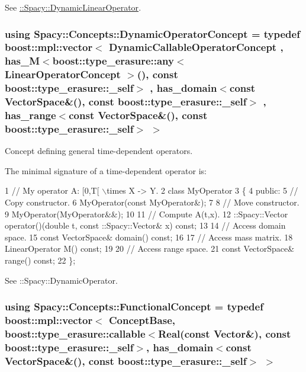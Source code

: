 See \hyperlink{group__SpacyGroup_gaad10aa7d5443703377b768fa41a3c7ea_DynamicLinearOperatorAnchor}{\+:\+:Spacy\+:\+:Dynamic\+Linear\+Operator}. \hypertarget{group__ConceptGroup_ga2c979d268f0ca7a436776a9631d10af7_ga2c979d268f0ca7a436776a9631d10af7}{}
\subsubsection[{Dynamic\+Operator\+Concept}]{\setlength{\rightskip}{0pt plus 5cm}using {\bf Spacy\+::\+Concepts\+::\+Dynamic\+Operator\+Concept} = typedef boost\+::mpl\+::vector$<$ Dynamic\+Callable\+Operator\+Concept , has\+\_\+\+M$<$boost\+::type\+\_\+erasure\+::any$<$ Linear\+Operator\+Concept $>$(), const boost\+::type\+\_\+erasure\+::\+\_\+self$>$ , has\+\_\+domain$<$const Vector\+Space\&(), const boost\+::type\+\_\+erasure\+::\+\_\+self$>$ , has\+\_\+range$<$const Vector\+Space\&(), const boost\+::type\+\_\+erasure\+::\+\_\+self$>$ $>$}\label{group__ConceptGroup_ga2c979d268f0ca7a436776a9631d10af7_ga2c979d268f0ca7a436776a9631d10af7}


Concept defining general time-\/dependent operators. 

\label{group__ConceptGroup_ga2c979d268f0ca7a436776a9631d10af7_DynamicOperatorConceptAnchor}%
\hypertarget{group__ConceptGroup_ga2c979d268f0ca7a436776a9631d10af7_DynamicOperatorConceptAnchor}{}%
The minimal signature of a time-\/dependent operator is\+: 
\begin{DoxyCode}
1 // My operator A: [0,T[ \(\backslash\)times X -> Y.
2 class MyOperator
3 \{
4 public:
5   // Copy constructor.
6   MyOperator(const MyOperator&);
7 
8   // Move constructor.
9   MyOperator(MyOperator&&);
10 
11   // Compute A(t,x).
12   ::Spacy::Vector operator()(double t, const ::Spacy::Vector& x) const;
13 
14   // Access domain space.
15   const VectorSpace& domain() const;
16 
17   // Access mass matrix.
18   LinearOperator M() const;
19 
20   // Access range space.
21   const VectorSpace& range() const;
22 \};
\end{DoxyCode}


See \+:\+:Spacy\+:\+:Dynamic\+Operator. \hypertarget{group__ConceptGroup_ga5273b50bd3e8c9a3f5a1e6b5f170836d_ga5273b50bd3e8c9a3f5a1e6b5f170836d}{}
\subsubsection[{Functional\+Concept}]{\setlength{\rightskip}{0pt plus 5cm}using {\bf Spacy\+::\+Concepts\+::\+Functional\+Concept} = typedef boost\+::mpl\+::vector$<$ Concept\+Base, boost\+::type\+\_\+erasure\+::callable$<$Real(const Vector\&), const boost\+::type\+\_\+erasure\+::\+\_\+self$>$, has\+\_\+domain$<$const Vector\+Space\&(), const boost\+::type\+\_\+erasure\+::\+\_\+self$>$ $>$}\label{group__ConceptGroup_ga5273b50bd3e8c9a3f5a1e6b5f170836d_ga5273b50bd3e8c9a3f5a1e6b5f170836d}


